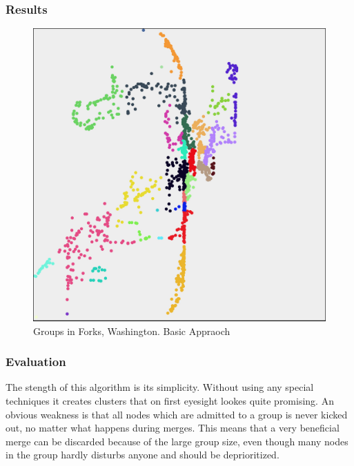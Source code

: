 \subsubsection{Results}
\begin{figure}
	\center
	\includegraphics[scale=0.46]{Images/computations/BASICForks.jpg}
	\caption{Groups in Forks, Washington. Basic Appraoch}
	\label{fig:basic_forks}
\end{figure}

\subsubsection{Evaluation}
The stength of this algorithm is its simplicity. Without using any special techniques it creates clusters that on first eyesight lookes quite promising. 
An obvious weakness is that all nodes which are admitted to a group is never kicked out, no matter what happens during merges. This means that a very beneficial 
merge can be discarded because of the large group size, even though many nodes in the group hardly disturbs anyone and should be deprioritized. 


%

